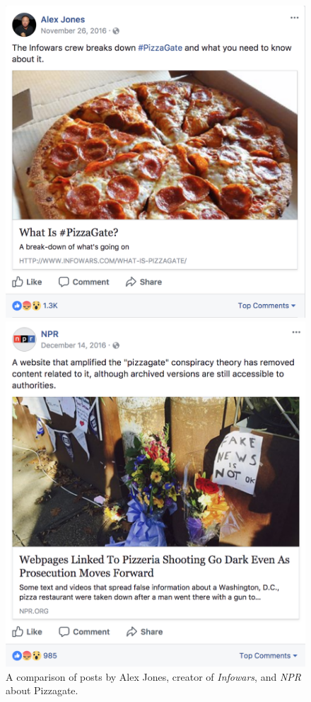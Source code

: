 \documentclass[12pt]{article}
\begin{document}
\begin{figure}[h]
	\begin{minipage}{0.48\textwidth}
		\centering
		\includegraphics[scale=.3]{pizzagate_alex_jones_fb}
	\end{minipage}
	\begin{minipage}{0.48\textwidth}
		\centering
		\includegraphics[scale=.3]{pizzagate_npr_fb}
	\end{minipage}
	\caption{A comparison of posts by Alex Jones, creator of {\it Infowars}, \cite{alex_jones_pizzagate_post} and {\it NPR} \cite{npr_pizzagate_post} about Pizzagate.}
\end{figure}
\end{document}
